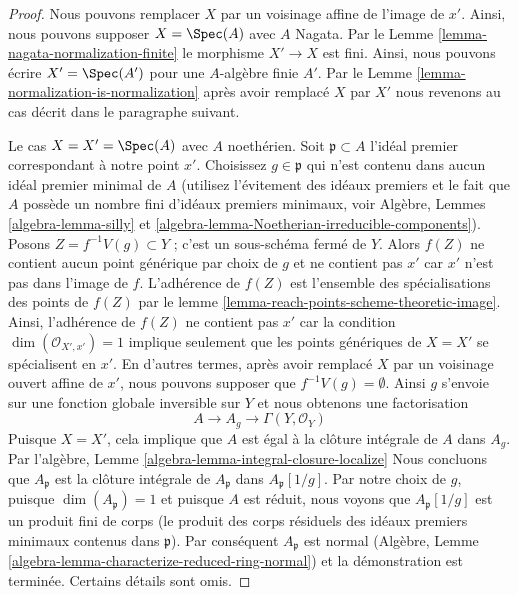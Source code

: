 \begin{proof}
Nous pouvons remplacer $X$ par un voisinage affine de l'image de
$x'$. Ainsi, nous pouvons supposer $X = \Spec(A)$
avec $A$ Nagata. Par le Lemme \ref{lemma-nagata-normalization-finite} le
morphisme $X' \to X$ est fini. Ainsi, nous pouvons écrire
$X' = \Spec(A')$ pour une $A$-algèbre finie $A'$.
Par le Lemme \ref{lemma-normalization-is-normalization} après avoir remplacé
$X$ par $X'$
nous revenons au cas décrit dans le paragraphe suivant.

\medskip\noindent
Le cas $X = X' = \Spec(A)$ avec $A$ noethérien. Soit $\mathfrak p \subset A$
l'idéal premier correspondant à notre point
$x'$. Choisissez $g \in \mathfrak p$ qui n'est contenu dans
aucun idéal premier minimal de $A$ (utilisez l'évitement des
idéaux premiers et le fait que $A$ possède un nombre
fini d'idéaux premiers minimaux, voir Algèbre, Lemmes
\ref{algebra-lemma-silly} et \ref{algebra-lemma-Noetherian-irreducible-components}). Posons $Z = f^{-1}V(g) \subset Y$ ; c'est
un sous-schéma fermé de $Y$. Alors $f(Z)$ ne contient aucun
point générique par choix de $g$ et ne contient pas $x'$
car $x'$ n'est pas dans l'image de $f$. L'adhérence
de $f(Z)$ est l'ensemble des spécialisations des points
de $f(Z)$ par le lemme \ref{lemma-reach-points-scheme-theoretic-image}. Ainsi, l'adhérence de $f(Z)$
ne contient pas $x'$ car la condition $\dim(\mathcal{O}_{X', x'}) = 1$ implique
seulement que les points génériques de $X = X'$ se spécialisent
en $x'$. En d'autres termes, après avoir remplacé
$X$ par un voisinage ouvert affine de $x'$,
nous pouvons supposer que $f^{-1}V(g) = \emptyset$. Ainsi $g$ s'envoie
sur une fonction globale inversible sur $Y$ et nous obtenons
une factorisation
$$
A \to A_g \to \Gamma(Y, \mathcal{O}_Y)
$$
Puisque $X = X'$, cela implique que $A$ est égal
à la clôture intégrale de
$A$ dans $A_g$. Par l'algèbre, Lemme \ref{algebra-lemma-integral-closure-localize}
Nous concluons que $A_\mathfrak p$ est la clôture intégrale
de $A_\mathfrak p$ dans $A_\mathfrak p[1/g]$. Par
notre choix de $g$, puisque $\dim(A_\mathfrak p) = 1$ et
puisque $A$ est réduit, nous voyons que $A_\mathfrak p[1/g]$
est un produit fini de corps (le produit des corps résiduels
des idéaux premiers minimaux contenus dans $\mathfrak p$). Par conséquent
$A_\mathfrak p$ est normal (Algèbre, Lemme \ref{algebra-lemma-characterize-reduced-ring-normal}) et la démonstration
est terminée. Certains détails sont omis.
\end{proof}







